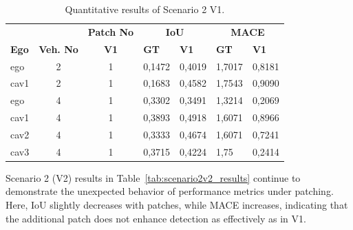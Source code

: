 \begin{table}[tph]
    \centering
    \caption{Quantitative results of Scenario 2 V1.}
    \label{tab:scenario2v1_results}
    \begin{tabularx}{\textwidth}{l c c *{4}{X}}
        \toprule
                         &             & \multicolumn{1}{c}{\textbf{Patch No}} & \multicolumn{2}{c}{\textbf{IoU}} & \multicolumn{2}{c}{\textbf{MACE}}                   \\
        \cmidrule(lr){4-5}\cmidrule(lr){6-7}
        \textbf{Ego}     &
        \textbf{Veh. No} &
        \textbf{V1}      &
        \textbf{GT}      & \textbf{V1} &
        \textbf{GT}      & \textbf{V1}                                                                                                                                  \\
        \midrule %
        ego              & 2           & 1                                     & 0,1472                           & 0,4019                            & 1,7017 & 0,8181 \\
        cav1             & 2           & 1                                     & 0,1683                           & 0,4582                            & 1,7543 & 0,9090 \\
        \midrule
        ego              & 4           & 1                                     & 0,3302                           & 0,3491                            & 1,3214 & 0,2069 \\
        cav1             & 4           & 1                                     & 0,3893                           & 0,4918                            & 1,6071 & 0,8966 \\
        cav2             & 4           & 1                                     & 0,3333                           & 0,4674                            & 1,6071 & 0,7241 \\
        cav3             & 4           & 1                                     & 0,3715                           & 0,4224                            & 1,75   & 0,2414 \\
        \bottomrule
    \end{tabularx}
\end{table}
Scenario 2 (V2) results in Table~\ref{tab:scenario2v2_results} continue to demonstrate the unexpected behavior of performance metrics under patching.
Here, IoU slightly decreases with patches, while MACE increases, indicating that the additional patch does not enhance detection as effectively as in V1.
